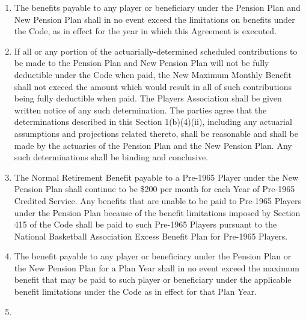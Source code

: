 \documentclass[
]{book}
\providecommand{\tightlist}{%
  \setlength{\itemsep}{0pt}\setlength{\parskip}{0pt}}
\begin{document}
\begin{enumerate}
\begin{enumerate}
    \begin{enumerate}
    \def\labelenumiii{(\roman{enumiii})}
    \tightlist
    \item
      The benefits payable to any player or beneficiary under the Pension Plan and New Pension Plan shall in no event exceed the limitations on benefits under the Code, as in effect for the year in which this Agreement is executed.
    \item
      If all or any portion of the actuarially-determined scheduled contributions to be made to the Pension Plan and New Pension Plan will not be fully deductible under the Code when paid, the New Maximum Monthly Benefit shall not exceed the amount which would result in all of such contributions being fully deductible when paid. The Players Association shall be given written notice of any such determination. The parties agree that the determinations described in this Section 1(b)(4)(ii), including any actuarial assumptions and projections related thereto, shall be reasonable and shall be made by the actuaries of the Pension Plan and the New Pension Plan. Any such determinations shall be binding and conclusive.
    \item
      The Normal Retirement Benefit payable to a Pre-1965 Player under the New Pension Plan shall continue to be \$200 per month for each Year of Pre-1965 Credited Service. Any benefits that are unable to be paid to Pre-1965 Players under the Pension Plan because of the benefit limitations imposed by Section 415 of the Code shall be paid to such Pre-1965 Players pursuant to the National Basketball Association Excess Benefit Plan for Pre-1965 Players.
    \item
      The benefit payable to any player or beneficiary under the Pension Plan or the New Pension Plan for a Plan Year shall in no event exceed the maximum benefit that may be paid to such player or beneficiary under the applicable benefit limitations under the Code as in effect for that Plan Year.
    \item

\end{enumerate}
\end{enumerate}
\end{enumerate}
\end{document}
